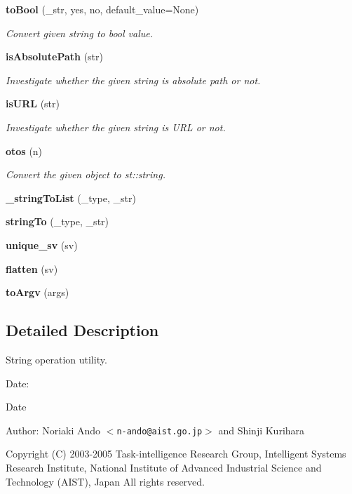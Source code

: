 \begin{CompactItemize}
{\bf to\-Bool} (\_\-str, yes, no, default\_\-value=None)
\begin{CompactList}\small\item\em Convert given string to bool value. \item\end{CompactList}\item 
{\bf is\-Absolute\-Path} (str)
\begin{CompactList}\small\item\em Investigate whether the given string is absolute path or not. \item\end{CompactList}\item 
{\bf is\-URL} (str)
\begin{CompactList}\small\item\em Investigate whether the given string is URL or not. \item\end{CompactList}\item 
{\bf otos} (n)
\begin{CompactList}\small\item\em Convert the given object to st::string. \item\end{CompactList}\item 
{\bf \_\-string\-To\-List} (\_\-type, \_\-str)
\item 
{\bf string\-To} (\_\-type, \_\-str)
\item 
{\bf unique\_\-sv} (sv)
\item 
{\bf flatten} (sv)
\item 
{\bf to\-Argv} (args)
\end{CompactItemize}


\subsection{Detailed Description}
String operation utility. 

\begin{Desc}
\item[Date:]\begin{Desc}
\item[Date]\end{Desc}
\end{Desc}
\begin{Desc}
\item[Author:]Noriaki Ando $<${\tt n-ando@aist.go.jp}$>$ and Shinji Kurihara\end{Desc}
Copyright (C) 2003-2005 Task-intelligence Research Group, Intelligent Systems Research Institute, National Institute of Advanced Industrial Science and Technology (AIST), Japan All rights reserved.

